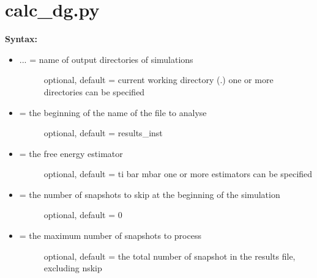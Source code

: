\documentclass[letterpaper,10pt,english]{sphinxmanual}
\begin{document}
\section{calc\_dg.py}
\label{tools:calc-dg-py}
\textbf{Syntax:}

\begin{itemize}
\item {} \begin{description}
\item[{ ... = name of output directories of simulations}] \leavevmode
optional, default = current working directory (.)
one or more directories can be specified

\end{description}

\item {} \begin{description}
\item[{ = the beginning of the name of the file to analyse}] \leavevmode
optional, default = results\_inst

\end{description}

\item {} \begin{description}
\item[{ = the free energy estimator}] \leavevmode
optional, default = ti bar mbar
one or more estimators can be specified

\end{description}

\item {} \begin{description}
\item[{ = the number of snapshots to skip at the beginning of the simulation}] \leavevmode
optional, default = 0

\end{description}

\item {} \begin{description}
\item[{ = the maximum number of snapshots to process}] \leavevmode
optional, default = the total number of snapshot in the results file, excluding nskip


\end{description}
\end{itemize}
\end{document}
